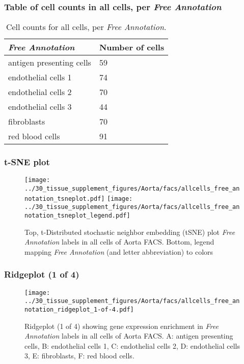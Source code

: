 \subsubsection{Table of cell counts in all cells, per \emph{Free Annotation}}\begin{table}[h]
\centering
\label{my-label}
\begin{tabular}{@{}ll@{}}
\toprule

\emph{Free Annotation}& Number of cells \\ \midrule
antigen presenting cells & 59 \\

endothelial cells 1 & 74 \\

endothelial cells 2 & 70 \\

endothelial cells 3 & 44 \\

fibroblasts & 70 \\

red blood cells & 91 \\
\bottomrule
\end{tabular}
\caption{Cell counts for all cells, per \emph{Free Annotation}.}
\end{table}

\clearpage
\subsubsection{t-SNE plot}
\begin{figure}[h]
\centering
\texttt{[image: ../30\_tissue\_supplement\_figures/Aorta/facs/allcells\_free\_annotation\_tsneplot.pdf]}
\texttt{[image: ../30\_tissue\_supplement\_figures/Aorta/facs/allcells\_free\_annotation\_tsneplot\_legend.pdf]}
\caption{Top, t-Distributed stochastic neighbor embedding (tSNE) plot  \emph{Free Annotation} labels in all cells of Aorta FACS. Bottom, legend mapping \emph{Free Annotation} (and letter abbreviation) to colors}
\end{figure}


\clearpage

\subsubsection{Ridgeplot (1 of 4)}
\begin{figure}[h]
\centering
\texttt{[image: ../30\_tissue\_supplement\_figures/Aorta/facs/allcells\_free\_annotation\_ridgeplot\_1-of-4.pdf]}

\caption{ Ridgeplot (1 of 4)  showing gene expression enrichment in \emph{Free Annotation} labels in all cells of Aorta FACS. A: antigen presenting cells, B: endothelial cells 1, C: endothelial cells 2, D: endothelial cells 3, E: fibroblasts, F: red blood cells.}
\end{figure}


